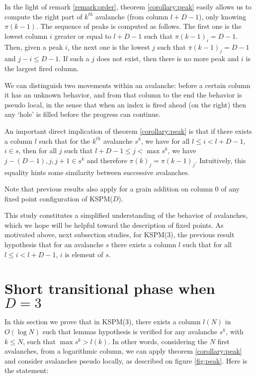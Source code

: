 \documentclass[11pt,a4paper]{llncs}
\begin{document}
  In the light of remark \ref{remark:order}, theorem \ref{corollary:peak} easily allows us to compute the right part of $k^{th}$ avalanche (from column $l + D-1$), only knowing $\pi(k-1)$. The sequence of peaks is computed as follows. The first one is the lowest column $i$ greater or equal to $l+D-1$ such that $\pi(k-1)_i=D-1$. Then, given a peak $i$, the next one is the lowest  $j$ such that $\pi(k-1)_j = D-1$  and $j- i \leq D-1$. If such a $j$ does not exist, then there is no more peak and $i$ is the largest fired column.

  We can distinguish two movements within an avalanche: before a certain column it has an unknown behavior, and from that column to the end the behavior is pseudo local, in the sense that when an index is fired ahead (on the right) then any `hole' is filled before the progress can continue.

An important direct implication of theorem \ref{corollary:peak} is that if there exists a column $l$ such that for the $k^{th}$ avalanche $s^k$, we have for all $l \leq i < l+D-1$, $i \in s$, then for all $j$ such that $l+D-1 \leq j < \max s^k$, we have $j-(D-1), j, j+1 \in s^k$ and therefore $\pi(k)_j=\pi(k-1)_j$. Intuitively, this equality hints some similarity between successive avalanches.

Note that previous results also apply for a grain addition on column 0 of any fixed point configuration of KSPM($D$).

This study constitutes a simplified understanding of the behavior of avalanches, which we hope will be helpful toward the description of fixed points. As motivated above, next subsection studies, for KSPM(3),  the previous result hypothesis  that for an avalanche $s$ there exists a column $l$ such that for all $l \leq i < l+D-1$, $i$ is element of $s$.\\
    
\section{Short transitional phase when $D=3$}\label{section:bounding}

In this section we prove that in KSPM(3), there exists a column $l(N)$ in $O(\log N)$ such that lemmas hypothesis is verified for any avalanche $s^k$, with $k \leq N$, such that $\max s^k > l(k)$. In other words, considering the $N$ first avalanches, from a logarithmic column,  we can apply theorem \ref{corollary:peak} and consider avalanches pseudo locally, as described on figure \ref{fig:peak}. Here is the statement:
\end{document}
